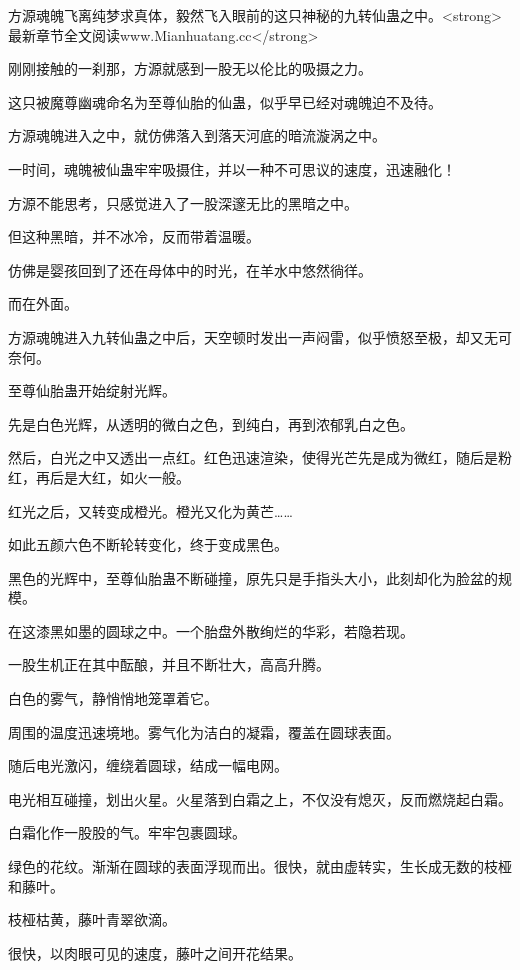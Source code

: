 
\begin{this_body}

方源魂魄飞离纯梦求真体，毅然飞入眼前的这只神秘的九转仙蛊之中。<strong>最新章节全文阅读www.Mianhuatang.cc</strong>

刚刚接触的一刹那，方源就感到一股无以伦比的吸摄之力。

这只被魔尊幽魂命名为至尊仙胎的仙蛊，似乎早已经对魂魄迫不及待。

方源魂魄进入之中，就仿佛落入到落天河底的暗流漩涡之中。

一时间，魂魄被仙蛊牢牢吸摄住，并以一种不可思议的速度，迅速融化！

方源不能思考，只感觉进入了一股深邃无比的黑暗之中。

但这种黑暗，并不冰冷，反而带着温暖。

仿佛是婴孩回到了还在母体中的时光，在羊水中悠然徜徉。

而在外面。

方源魂魄进入九转仙蛊之中后，天空顿时发出一声闷雷，似乎愤怒至极，却又无可奈何。

至尊仙胎蛊开始绽射光辉。

先是白色光辉，从透明的微白之色，到纯白，再到浓郁乳白之色。

然后，白光之中又透出一点红。红色迅速渲染，使得光芒先是成为微红，随后是粉红，再后是大红，如火一般。

红光之后，又转变成橙光。橙光又化为黄芒……

如此五颜六色不断轮转变化，终于变成黑色。

黑色的光辉中，至尊仙胎蛊不断碰撞，原先只是手指头大小，此刻却化为脸盆的规模。

在这漆黑如墨的圆球之中。一个胎盘外散绚烂的华彩，若隐若现。

一股生机正在其中酝酿，并且不断壮大，高高升腾。

白色的雾气，静悄悄地笼罩着它。

周围的温度迅速境地。雾气化为洁白的凝霜，覆盖在圆球表面。

随后电光激闪，缠绕着圆球，结成一幅电网。

电光相互碰撞，划出火星。火星落到白霜之上，不仅没有熄灭，反而燃烧起白霜。

白霜化作一股股的气。牢牢包裹圆球。

绿色的花纹。渐渐在圆球的表面浮现而出。很快，就由虚转实，生长成无数的枝桠和藤叶。

枝桠枯黄，藤叶青翠欲滴。

很快，以肉眼可见的速度，藤叶之间开花结果。


\end{this_body}
